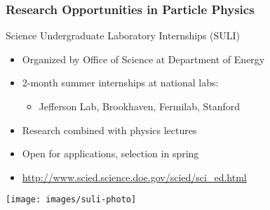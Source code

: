 \begin{frame}
 \frametitle{Research Opportunities in Particle Physics}
 \begin{block}{Science Undergraduate Laboratory Internships (SULI)}
  \begin{itemize}
   \item Organized by Office of Science at Department of Energy
   \item 2-month summer internships at national labs:
    \begin{itemize}
     \item \alert{Jefferson Lab}, Brookhaven, Fermilab, Stanford
    \end{itemize}
   \item Research combined with physics lectures
   \item Open for applications, selection in spring
   \item {\small \url{http://www.scied.science.doe.gov/scied/sci_ed.html}}
  \end{itemize}
 \end{block}
 \begin{center}
  \texttt{[image: images/suli-photo]}
 \end{center}
\end{frame}
